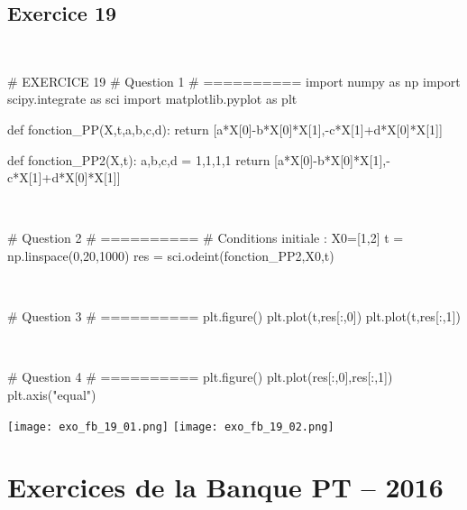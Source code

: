 \documentclass[10pt,fleqn]{article} %
\begin{document}
\subsection*{Exercice 19}

\begin{corrige}
$\quad$
\begin{python}
# EXERCICE 19
# Question 1 
# ==========
import numpy as np
import scipy.integrate as sci
import matplotlib.pyplot as plt

def fonction_PP(X,t,a,b,c,d):
    return [a*X[0]-b*X[0]*X[1],-c*X[1]+d*X[0]*X[1]]

def fonction_PP2(X,t):
    a,b,c,d = 1,1,1,1
    return [a*X[0]-b*X[0]*X[1],-c*X[1]+d*X[0]*X[1]]
\end{python}
\end{corrige}


\begin{corrige}
$\quad$
\begin{python}
# Question 2 
# ==========
# Conditions initiale : 
X0=[1,2]
t = np.linspace(0,20,1000)
res = sci.odeint(fonction_PP2,X0,t)
\end{python}
\end{corrige}

\begin{corrige}
$\quad$
\begin{python}
# Question 3 
# ==========
plt.figure()
plt.plot(t,res[:,0])
plt.plot(t,res[:,1])
\end{python}
\end{corrige}

\begin{corrige}
$\quad$
\begin{python}
# Question 4 
# ==========
plt.figure()
plt.plot(res[:,0],res[:,1])
plt.axis("equal")
\end{python}
\end{corrige}



\begin{center}
\texttt{[image: exo\_fb\_19\_01.png]}
\texttt{[image: exo\_fb\_19\_02.png]}
\end{center}

%

\newpage 
\section{Exercices de la Banque PT -- 2016}
\end{document}
